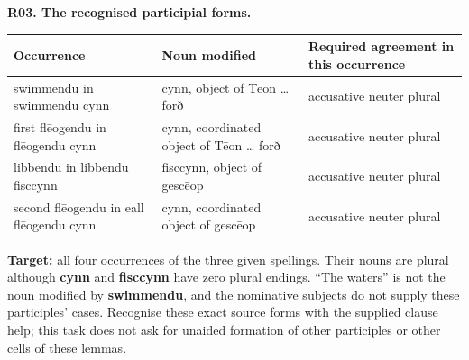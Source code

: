 \par\begin{minipage}{\linewidth}\raggedright
\textbf{R03. The recognised participial forms.}

\par\begingroup
\fontsize{10.5}{13.2}\selectfont
\setlength{\LTleft}{0pt}\setlength{\LTright}{\fill}
\noindent
\begin{tabular}{@{}>{\raggedright\arraybackslash}p{39.66mm}>{\raggedright\arraybackslash}p{40.61mm}>{\raggedright\arraybackslash}p{38.11mm}@{}}
\toprule
\textbf{Occurrence} & \textbf{Noun modified} & \textbf{Required agreement in this occurrence} \\
\midrule
swimmendu in swimmendu cynn & cynn, object of Tēon … forð & accusative neuter plural \\
first flēogendu in flēogendu cynn & cynn, coordinated object of Tēon … forð & accusative neuter plural \\
libbendu in libbendu fisccynn & fisccynn, object of gescēop & accusative neuter plural \\
second flēogendu in eall flēogendu cynn & cynn, coordinated object of gescēop & accusative neuter plural \\
\bottomrule
\end{tabular}
\par\endgroup

\textbf{Target:} all four occurrences of the three given spellings. Their nouns are plural although \textbf{cynn} and \textbf{fisccynn} have zero plural endings. “The waters” is not the noun modified by \textbf{swimmendu}, and the nominative subjects do not supply these participles’ cases. Recognise these exact source forms with the supplied clause help; this task does not ask for unaided formation of other participles or other cells of these lemmas.

\end{minipage}\par\addvspace{4pt}

